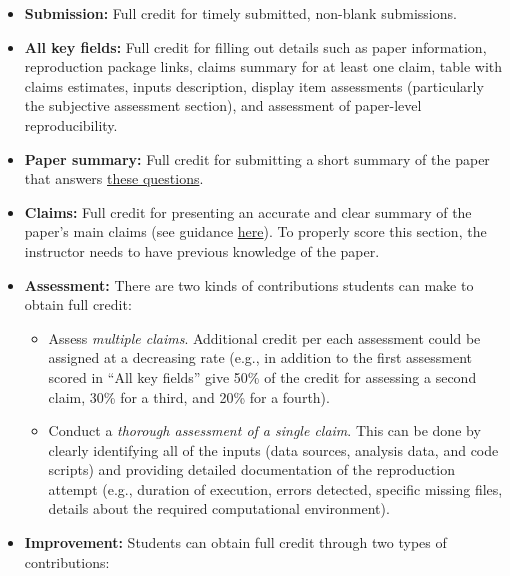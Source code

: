 \documentclass[
]{book}
\providecommand{\tightlist}{%
  \setlength{\itemsep}{0pt}\setlength{\parskip}{0pt}}
\begin{document}
\begin{itemize}
\tightlist
\item
  \textbf{Submission:} Full credit for timely submitted, non-blank submissions.\\
\item
  \textbf{All key fields:} Full credit for filling out details such as paper information, reproduction package links, claims summary for at least one claim, table with claims estimates, inputs description, display item assessments (particularly the subjective assessment section), and assessment of paper-level reproducibility.\\
\item
  \textbf{Paper summary:} Full credit for submitting a short summary of the paper that answers \href{https://bitss.github.io/ACRE/scoping.html\#read-sum}{these questions}.\\
\item
  \textbf{Claims:} Full credit for presenting an accurate and clear summary of the paper's main claims (see guidance \href{https://bitss.github.io/ACRE/scoping.html\#scoping}{here}). To properly score this section, the instructor needs to have previous knowledge of the paper.\\
\item
  \textbf{Assessment:} There are two kinds of contributions students can make to obtain full credit:

  \begin{itemize}
  \tightlist
  \item
    Assess \emph{multiple claims}. Additional credit per each assessment could be assigned at a decreasing rate (e.g., in addition to the first assessment scored in ``All key fields'' give 50\% of the credit for assessing a second claim, 30\% for a third, and 20\% for a fourth).\\
  \item
    Conduct a \emph{thorough assessment of a single claim}. This can be done by clearly identifying all of the inputs (data sources, analysis data, and code scripts) and providing detailed documentation of the reproduction attempt (e.g., duration of execution, errors detected, specific missing files, details about the required computational environment).\\
  \end{itemize}
\item
  \textbf{Improvement:} Students can obtain full credit through two types of contributions:


\end{itemize}
\end{document}
